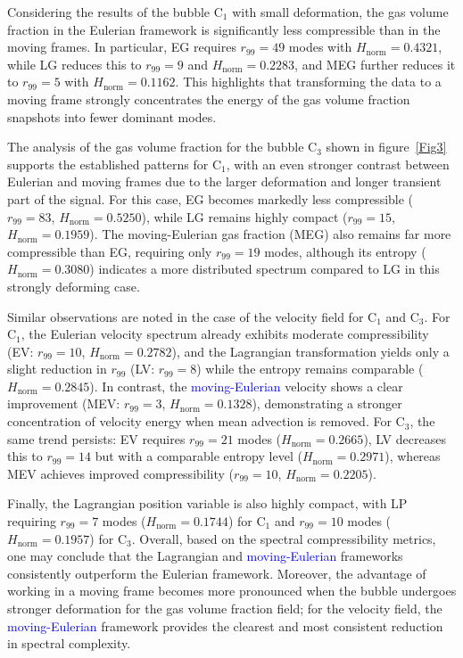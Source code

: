 \documentclass[a4paper,fleqn]{cas-sc}
\newcommand{\hl}[1]{\textcolor{blue}{#1}}
\newcommand{\hl}[1]{#1}
\begin{document}
	Considering the results of the bubble C$_1$ with small deformation, the gas volume fraction in the Eulerian framework is significantly less compressible than in the moving frames. In particular, EG requires $r_{99}=49$ modes with $H_{\mathrm{norm}}=0.4321$, while LG reduces this to $r_{99}=9$ and $H_{\mathrm{norm}}=0.2283$, and MEG further reduces it to $r_{99}=5$ with $H_{\mathrm{norm}}=0.1162$. This highlights that transforming the data to a moving frame strongly concentrates the energy of the gas volume fraction snapshots into fewer dominant modes.
	
	The analysis of the gas volume fraction for the bubble C$_3$ shown in figure~\ref{Fig3} supports the established patterns for C$_1$, with an even stronger contrast between Eulerian and moving frames due to the larger deformation and longer transient part of the signal. For this case, EG becomes markedly less compressible ($r_{99}=83$, $H_{\mathrm{norm}}=0.5250$), while LG remains highly compact ($r_{99}=15$, $H_{\mathrm{norm}}=0.1959$). The moving-Eulerian gas fraction (MEG) also remains far more compressible than EG, requiring only $r_{99}=19$ modes, although its entropy ($H_{\mathrm{norm}}=0.3080$) indicates a more distributed spectrum compared to LG in this strongly deforming case.
	
	Similar observations are noted in the case of the velocity field for C$_1$ and C$_3$. For C$_1$, the Eulerian velocity spectrum already exhibits moderate compressibility (EV: $r_{99}=10$, $H_{\mathrm{norm}}=0.2782$), and the Lagrangian transformation yields only a slight reduction in $r_{99}$ (LV: $r_{99}=8$) while the entropy remains comparable ($H_{\mathrm{norm}}=0.2845$). In contrast, the \hl{moving-Eulerian} velocity shows a clear improvement (MEV: $r_{99}=3$, $H_{\mathrm{norm}}=0.1328$), demonstrating a stronger concentration of velocity energy when mean advection is removed. For C$_3$, the same trend persists: EV requires $r_{99}=21$ modes ($H_{\mathrm{norm}}=0.2665$), LV decreases this to $r_{99}=14$ but with a comparable entropy level ($H_{\mathrm{norm}}=0.2971$), whereas MEV achieves improved compressibility ($r_{99}=10$, $H_{\mathrm{norm}}=0.2205$).
	
	Finally, the Lagrangian position variable is also highly compact, with LP requiring $r_{99}=7$ modes ($H_{\mathrm{norm}}=0.1744$) for C$_1$ and $r_{99}=10$ modes ($H_{\mathrm{norm}}=0.1957$) for C$_3$. Overall, based on the spectral compressibility metrics, one may conclude that the Lagrangian and \hl{moving-Eulerian} frameworks consistently outperform the Eulerian framework. Moreover, the advantage of working in a moving frame becomes more pronounced when the bubble undergoes stronger deformation for the gas volume fraction field; for the velocity field, the \hl{moving-Eulerian} framework provides the clearest and most consistent reduction in spectral complexity.
	
\end{document}
